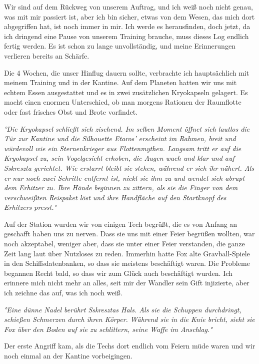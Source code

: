 \documentclass[11pt]{scrartcl}
\begin{document}
Wir sind auf dem Rückweg von unserem Auftrag, und ich weiß noch nicht
genau, was mit mir passiert ist, aber ich bin sicher, etwas von dem
Wesen, das mich dort abgegriffen hat, ist noch immer in mir. Ich werde
es herausfinden, doch jetzt, da ich dringend eine Pause von unserem
Training brauche, muss dieses Log endlich fertig werden. Es ist schon zu
lange unvollständig, und meine Erinnerungen verlieren bereits an
Schärfe.

Die 4 Wochen, die unser Hinflug dauern sollte, verbrachte ich
hauptsächlich mit meinem Training und in der Kantine. Auf dem Planeten
hatten wir uns mit echtem Essen ausgestattet und es in zwei zusätzlichen
Kryokapseln gelagert. Es macht einen enormen Unterschied, ob man morgens
Rationen der Raumflotte oder fast frisches Obst und Brote vorfindet.

\emph{°Die Kryokapsel schließt sich zischend. Im selben Moment öffnet
sich lautlos die Tür zur Kantine und die Silhouette Etaros' erscheint im
Rahmen, breit und würdevoll wie ein Sternenkrieger aus Flottenmythen.
Langsam tritt er auf die Kryokapsel zu, sein Vogelgesicht erhoben, die
Augen wach und klar und auf Sskreszta gerichtet. Wie erstarrt bleibt sie
stehen, während er sich ihr nähert. Als er nur noch zwei Schritte
entfernt ist, nickt sie ihm zu und wendet sich abrupt dem Erhitzer zu.
Ihre Hände beginnen zu zittern, als sie die Finger von dem verschweißten
Reispaket löst und ihre Handfläche auf den Startknopf des Erhitzers
presst.°}

Auf der Station wurden wir von einigen Tech begrüßt, die es von Anfang
an geschafft haben uns zu nerven. Dass sie uns mit einer Feier begrüßen
wollten, war noch akzeptabel, weniger aber, dass sie unter einer Feier
verstanden, die ganze Zeit lang laut über Nutzloses zu reden. Immerhin
hatte Fox alte Gravball-Spiele in den Schiffsdatenbanken, so dass sie
meistens beschäftigt waren. Die Probleme begannen Recht bald, so dass
wir zum Glück auch beschäftigt wurden. Ich erinnere mich nicht mehr an
alles, seit mir der Wandler sein Gift injizierte, aber ich zeichne das
auf, was ich noch weiß.

\emph{°Eine dünne Nadel berührt Sskresztas Hals. Als sie die Schuppen
durchdringt, schießen Schmerzen durch ihren Körper. Während sie in die
Knie bricht, sieht sie Fox über den Boden auf sie zu schlittern, seine
Waffe im Anschlag.°}

Der erste Angriff kam, als die Techs dort endlich vom Feiern müde waren
und wir noch einmal an der Kantine vorbeigingen.
\end{document}
